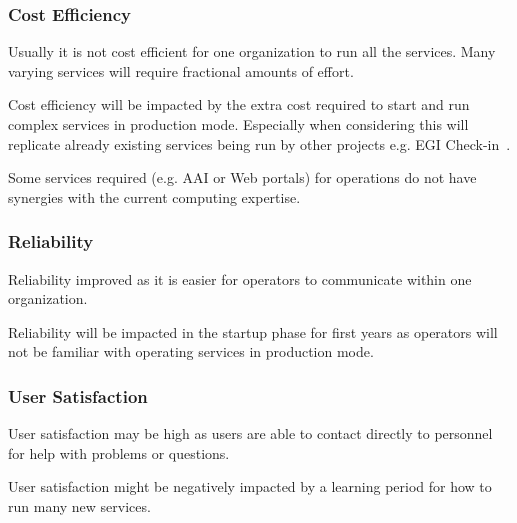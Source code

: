 \documentclass[12pt,a4paper]{article}
\begin{document}
\subsubsection*{Cost Efficiency}
\bitm
\item Usually it is not cost efficient for one organization to run all the services. Many varying services will require fractional amounts of effort.
\item Cost efficiency will be impacted by the extra cost required to start and run complex services in production mode. 
Especially when considering this will replicate already existing services being run by other \einfra projects e.g. EGI Check-in~\cite{egi-checkin}.
\item Some services required (e.g. AAI or Web portals) for \ED operations do not have synergies with the current \EC computing expertise.
\eitm

\subsubsection*{Reliability}
\bitm
\item Reliability improved as it is easier for operators to communicate within one organization. %
\item Reliability will be impacted in the startup phase for first years as operators will not be familiar with operating services in production mode.
\eitm

\subsubsection*{User Satisfaction}
\bitm
\item User satisfaction may be high as users are able to contact directly to \EC personnel for help with problems or questions.
\item User satisfaction might be negatively impacted by a learning period for how to run many new services.
\eitm

\end{document}
